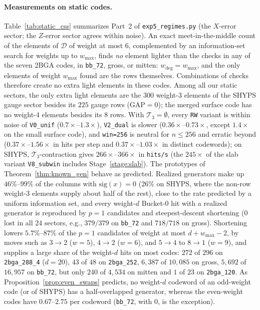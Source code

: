 \documentclass[12pt]{article}
\theoremstyle{definition}
\newcommand{\Dc}{\mathcal{D}}
\newcommand{\Tc}{\mathcal{T}_3}
\newcommand{\ttt}[1]{\texttt{#1}}
\begin{document}
\paragraph{Measurements on static codes.}
Table~\ref{tab:static_css} summarizes Part~2 of \ttt{exp5\_regimes.py} (the $X$-error sector; the $Z$-error sector
agrees within noise). An exact meet-in-the-middle count of the elements of $\Dc$ of weight at most $6$, complemented by
an information-set search for weights up to $w_{\max}$, finds \emph{no} element lighter than the checks in any of the
seven 2BGA codes, in \ttt{bb\_72}, gross, or mitten: $w_{\deg} = w_{\max}$, and the only elements of weight
$w_{\max}$ found are the rows themselves. Combinations of checks therefore create no extra light elements in these
codes. Among all our static sectors, the only extra light elements are the $300$ weight-3 elements of the SHYPS gauge
sector besides its $225$ gauge rows ($\mathrm{GAP} = 0$); the merged surface code has no weight-4 elements besides its
$8$ rows. With $\Tc = \emptyset$, every \ttt{RW} variant is within noise of \ttt{V0\_unif} ($0.7\times$--$1.3\times$),
\ttt{V2\_dual} is slower ($0.36\times$--$0.73\times$, except $1.4\times$ on the small surface code), and \ttt{win=256}
is neutral for $n \le 256$ and erratic beyond ($0.37\times$--$1.56\times$ in hits per step and
$0.37\times$--$1.03\times$ in distinct codewords); on SHYPS, $\Tc$-contraction gives $266\times$--$366\times$ in
\ttt{hits/s} (the $245\times$ of the slab variant \ttt{V8\_subwin} includes Stage~\ref{stage:slab}). The prototypes of
Theorem~\ref{thm:known_gen} behave as predicted. Realized generators make up $46\%$--$99\%$ of the columns with
$\mathrm{sig}(x) = 0$ ($26\%$ on SHYPS, where the non-row weight-3 elements supply about half of the rest), close to
the rate predicted by a uniform information set, and every weight-$d$ Bucket-0 hit with a realized generator is
reproduced by $p = 1$ candidates and steepest-descent shortening ($0$ lost in all $24$ sectors, e.g., $379/379$ on
\ttt{bb\_72} and $718/718$ on gross). Shortening lowers $5.7\%$--$87\%$ of the $p = 1$ candidates of weight at most $d
+ w_{\max} - 2$, by moves such as $3 \to 2$ ($w = 5$), $4 \to 2$ ($w = 6$), and $5 \to 4$ to $8 \to 1$ ($w = 9$), and
supplies a large share of the weight-$d$ hits on most codes: $272$ of $296$ on \ttt{2bga\_288\_4} ($d = 20$), $43$ of
$48$ on \ttt{2bga\_252}, $6{,}387$ of $10{,}085$ on gross, $5{,}692$ of $16{,}957$ on \ttt{bb\_72}, but only $240$ of
$4{,}534$ on mitten and $1$ of $23$ on \ttt{2bga\_120}. As Proposition~\ref{prop:even_swaps} predicts, no weight-$d$
codeword of an odd-weight code (or of SHYPS) has a half-overlapped generator, whereas the even-weight codes have
$0.67$--$2.75$ per codeword (\ttt{bb\_72}, with $0$, is the exception).
\end{document}
